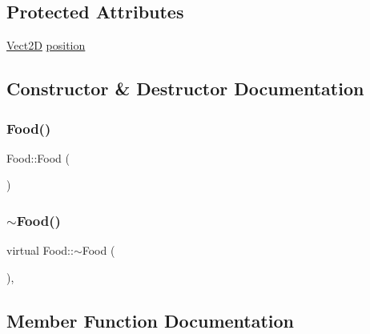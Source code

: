 \subsection*{Protected Attributes}
\begin{DoxyCompactItemize}
\item 
\hyperlink{classVect2D}{Vect2D} \hyperlink{classCartesianObject2D_ae02ec6ed11f9bfc0c748da033d6a32f9_ae02ec6ed11f9bfc0c748da033d6a32f9}{position}
\end{DoxyCompactItemize}


\subsection{Constructor \& Destructor Documentation}
\mbox{\label{classFood_a1c3ad8fc9b17466a7c47a978c7ce79c5_a1c3ad8fc9b17466a7c47a978c7ce79c5}} 
\subsubsection{\texorpdfstring{Food()}{Food()}}
{\footnotesize\ttfamily Food\+::\+Food (\begin{DoxyParamCaption}{ }\end{DoxyParamCaption})\hspace{0.3cm}{\ttfamily [default]}}

\mbox{\label{classFood_ae2a4e53388ef5377a6eb366dcdde3dd7_ae2a4e53388ef5377a6eb366dcdde3dd7}} 
\subsubsection{\texorpdfstring{$\sim$\+Food()}{~Food()}}
{\footnotesize\ttfamily virtual Food\+::$\sim$\+Food (\begin{DoxyParamCaption}{ }\end{DoxyParamCaption})\hspace{0.3cm}{\ttfamily [virtual]}, {\ttfamily [default]}}



\subsection{Member Function Documentation}
\mbox{\label{classFood_a81ef8f27be431b43bfa244fde21ec90d_a81ef8f27be431b43bfa244fde21ec90d}} 
